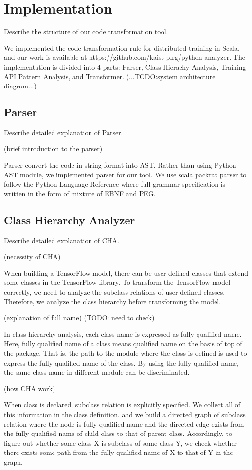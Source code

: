 \section{Implementation}\label{sec:impl}
Describe the structure of our code transformation tool.

We implemented the code transformation rule for distributed training in Scala,
and our work is available at https://github.com/kaist-plrg/python-analyzer.
The implementation is divided into 4 parts:
Parser, Class Hierachy Analysis,
Training API Pattern Analysis, and Transformer.
(...TODO:system architecture diagram...)

\subsection{Parser}
Describe detailed explanation of Parser.

(brief introduction to the parser)

Parser convert the code in string format into AST.
Rather than using Python AST module, we implemented parser for our tool.
We use scala packrat parser to follow the Python Language Reference
where full grammar specification is written in the form of mixture of EBNF and PEG.

\subsection{Class Hierarchy Analyzer}
Describe detailed explanation of CHA.

(necessity of CHA)

When building a TensorFlow model, there can be user defined classes
that extend some classes in the TensorFlow library.
To transform the TensorFlow model correctly,
we need to analyze the subclass relations of user defined classes.
Therefore, we analyze the class hierarchy before transforming the model.

(explanation of full name)
(TODO: need to check)

In class hierarchy analysis, each class name is expressed as fully qualified name.
Here, fully qualified name of a class means qualified name\cite{???}
on the basis of top of the package.
That is, the path to the module where the class is defined
is used to express the fully qualified name of the class.
By using the fully qualified name, the same class name in different module
can be discriminated.

(how CHA work)

When class is declared, subclass relation is explicitly specified.
We collect all of this information in the class definition,
and we build a directed graph of subclass relation
where the node is fully qualified name and the directed edge exists
from the fully qualified name of child class to that of parent class.
Accordingly, to figure out whether some class X is subclass of some class Y,
we check whether there exists some path from the fully qualified name of X
to that of Y in the graph.

